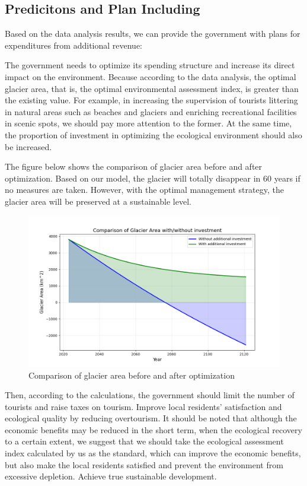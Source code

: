 \documentclass[UTF8]{mcmthesis}
\begin{document}
        \subsection{Predicitons and Plan Including}
		Based on the data analysis results, we can provide the government with plans for expenditures from additional revenue:

		The government needs to optimize its spending structure and increase its direct impact on the environment. Because according to the data analysis, the optimal glacier area, that is, the optimal environmental assessment index, is greater than the existing value. For example, in increasing the supervision of tourists littering in natural areas such as beaches and glaciers and enriching recreational facilities in scenic spots, we should pay more attention to the former. At the same time, the proportion of investment in optimizing the ecological environment should also be increased.
		
        The figure below shows the comparison of glacier area before and after optimization. Based on our model, the glacier will totally disappear in 60 years if no measures are taken. However, with the optimal management strategy, the glacier area will be preserved at a sustainable level.
        \begin{figure}[htbp]
            \centering
            \includegraphics[width=13cm]{predict.png}
            \caption{Comparison of glacier area before and after optimization}
        \end{figure}
        
        Then, according to the calculations, the government should limit the number of tourists and raise taxes on tourism. Improve local residents' satisfaction and ecological quality by reducing overtourism. It should be noted that although the economic benefits may be reduced in the short term, when the ecological recovery to a certain extent, we suggest that we should take the ecological assessment index calculated by us as the standard, which can improve the economic benefits, but also make the local residents satisfied and prevent the environment from excessive depletion. Achieve true sustainable development.
        
\end{document}
